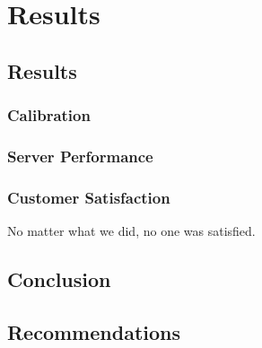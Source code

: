 \chapter{Results}

\section{Results}

\subsection{Calibration}

\subsection{Server Performance}

\subsection{Customer Satisfaction}

No matter what we did, no one was satisfied.

\section{Conclusion}


\section{Recommendations}


